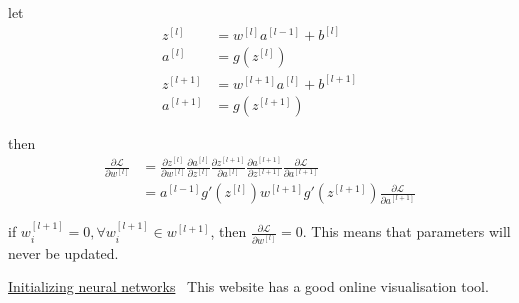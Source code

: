\documentclass{subfiles}
\begin{document}
let
\begin{align*}
z^{[l]} & = w^{[l]} a^{[l-1]} + b^{[l]} \\
a^{[l]} & = g(z^{[l]}) \\
z^{[l+1]} & = w^{[l + 1]} a^{[l]} + b^{[l+1]} \\
a^{[l+1]} & = g(z^{[l+1]})
\end{align*}

then
\begin{align*}
\frac{\partial \mathcal{L}}{\partial w^{[l]}}
& = \frac{\partial z^{[l]}}{\partial w^{[l]}}
    \frac{\partial a^{[l]}}{\partial z^{[l]}}
    \frac{\partial z^{[l+1]}}{\partial a^{[l]}}
    \frac{\partial a^{[l+1]}}{\partial z^{[l+1]}}
    \frac{\partial \mathcal{L}}{\partial a^{[l+1]}} \\
& = a^{[l-1]} g'(z^{[l]}) w^{[l+1]} g'(z^{[l+1]})
    \frac{\partial \mathcal{L}}{\partial a^{[l+1]}}
\end{align*}

if $w^{[l+1]}_i = 0, \forall w^{[l+1]}_i \in w^{[l+1]}$,
then $\frac{\partial \mathcal{L}}{\partial w^{[l]}} = 0$.
This means that parameters will never be updated.

\href{https://www.deeplearning.ai/ai-notes/initialization/}{Initializing neural networks} \
This website has a good online visualisation tool.
\end{document}
